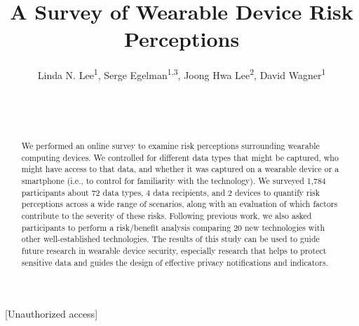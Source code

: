 \documentclass{acm_proc_article-sp}
\begin{document}
\title{A Survey of Wearable Device Risk Perceptions}



\author{
 \alignauthor Linda N. Lee\textsuperscript{1}, Serge Egelman\textsuperscript{1,3}, Joong Hwa Lee\textsuperscript{2}, David Wagner\textsuperscript{1}\\
   \vspace{0.5em}
   \\
   \\
   \\
}

\maketitle

\begin{abstract}
We performed an online survey to examine risk perceptions surrounding wearable computing devices. We controlled for different data types that might be captured, who might have access to that data, and whether it was captured on a wearable device or a smartphone (i.e., to control for familiarity with the technology). We surveyed 1,784 participants about 72 data types, 4 data recipients, and 2 devices to quantify risk perceptions across a wide range of scenarios, along with an evaluation of which factors contribute to the severity of these risks. Following previous work, we also asked participants to perform a risk/benefit analysis comparing 20 new technologies with other well-established technologies. The results of this study can be used to guide future research in wearable device security, especially research that helps to protect sensitive data and guides the design of effective privacy notifications and indicators.
\end{abstract}

[Unauthorized access]
\end{document}
